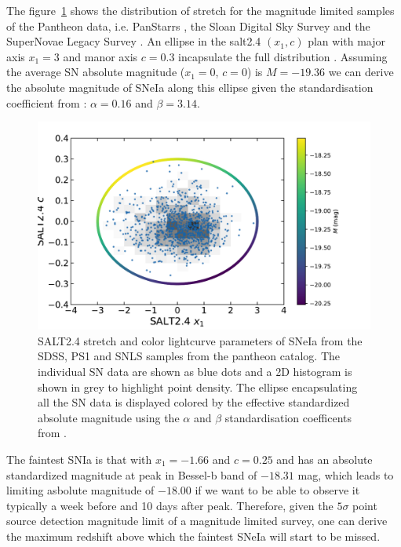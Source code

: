 \documentclass[bibnumber]{aa}
\newcommand{\mr}[1]{{\textcolor[rgb]{0.60,0.10,0.6}{#1}}}
\begin{document}
The figure~\ref{fig:maglim} shows the distribution of stretch for the magnitude
limited samples of the Pantheon data, i.e. PanStarrs \citep[PS1][]{ref}, the
Sloan Digital Sky Survey \citep[SDSS][]{ref} and the SuperNovae Legacy Survey
\citep[SNLS][]{astier2006}. An ellipse in the salt2.4 $(x_1, c)$ plan with major
axis $x_1=3$ and manor axis $c=0.3$ incapsulate the full distribution \citep[see
also][for a similar contour but using a less conservative
$c=0.2$]{campbell2013}. Assuming the average SN absolute magnitude ($x_1=0$,
$c=0$) is $M=-19.36$ \citep{kessler2009,scolnic2014} we can derive the absolute magnitude of
SNeIa along this ellipse given the standardisation coefficient from
\citep{scolnic2018a}: $\alpha=0.16$ and $\beta=3.14$.

\begin{figure}
    \centering
    \includegraphics[width=\linewidth]{Article_figures/zmax_maglim_all.pdf}
    \caption{SALT2.4 stretch and color lightcurve parameters of SNeIa from the
        SDSS, PS1 and SNLS samples from the pantheon catalog. The individual SN
        data are shown as blue dots and a 2D histogram is shown in grey to
        highlight point density. The ellipse encapsulating all the SN data is
        displayed colored by the effective standardized absolute magnitude using
    the $\alpha$ and $\beta$ standardisation coefficents from
\citep{scolnic2018}.}
    \label{fig:maglim}
\end{figure}


The faintest SNIa is that with $x_1=-1.66$ and $c=0.25$ and has an absolute \mr{standardized} magnitude at peak \mr{in Bessel-b band} of $-18.31$ mag, which leads to limiting asbolute magnitude of
$-18.00$ if we want to be able to observe it typically a week before and 10 days after peak.  
Therefore, given the $5\sigma$ point source detection magnitude
limit of a magnitude limited survey, one can derive the maximum redshift above which the faintest SNeIa will start to be missed. 
\end{document}
